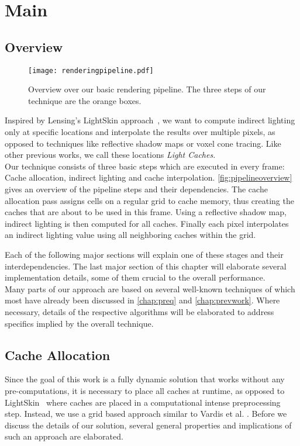 \documentclass[thesis.tex]{subfiles}
\begin{document}
\chapter{Main}\label{chap:basics}

\section{Overview}
\begin{figure}[h]
	\centering
	\texttt{[image: renderingpipeline.pdf]}
	\caption{Overview over our basic rendering pipeline. The three steps of our technique are the orange boxes.}
	\label{fig:pipelineoverview}
\end{figure}
%
Inspired by Lensing's LightSkin approach~\cite{bib:LightskinPaper}, we want to compute indirect lighting only at specific locations and interpolate the results over multiple pixels, as opposed to techniques like reflective shadow maps or voxel cone tracing.
Like other previous works, we call these locations \emph{Light Caches}.
\\
Our technique consists of three basic steps which are executed in every frame: Cache allocation, indirect lighting and cache interpolation.
\autoref{fig:pipelineoverview} gives an overview of the pipeline steps and their dependencies.
The cache allocation pass assigns cells on a regular grid to cache memory, thus creating the caches that are about to be used in this frame.
Using a reflective shadow map, indirect lighting is then computed for all caches.
Finally each pixel interpolates an indirect lighting value using all neighboring caches within the grid.

Each of the following major sections will explain one of these stages and their interdependencies.
The last major section of this chapter will elaborate several implementation details, some of them crucial to the overall performance.\\
Many parts of our approach are based on several well-known techniques of which most have already been discussed in \autoref{chap:preq} and \autoref{chap:prevwork}.
Where necessary, details of the respective algorithms will be elaborated to address specifics implied by the overall technique.

\section{Cache Allocation}
Since the goal of this work is a fully dynamic solution that works without any pre-computations, it is necessary to place all caches at runtime, as opposed to LightSkin~\cite{bib:LightskinPaper} where caches are placed in a computational intense preprocessing step.
Instead, we use a grid based approach similar to Vardis et al. \cite{bib:radiancecachechromaticcompression}.
Before we discuss the details of our solution, several general properties and implications of such an approach are elaborated.
\end{document}
